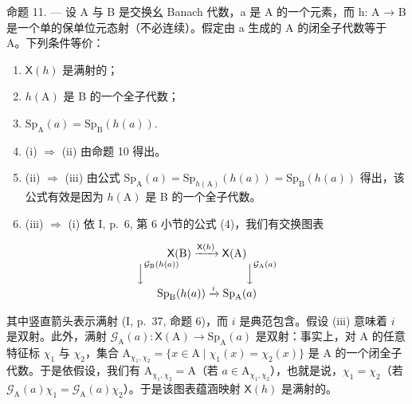 命题 11. --- 设 A 与 B 是交换幺 Banach 代数，a 是 A 的一个元素，而 h: A → B 是一个单的保单位元态射（不必连续）。假定由 a 生成的 A 的闭全子代数等于 A。下列条件等价：

\begin{enumerate}
\def\labelenumi{(\roman{enumi})}
\item
  \(\mathsf{X}(h)\) 是满射的；
\item
  \(h(\mathrm{A})\) 是 B 的一个全子代数；
\item
  \(\mathrm{Sp}_{\mathrm{A}}(a)=\mathrm{Sp}_{\mathrm{B}}(h(a)).\)
\item
  (i) \(\Longrightarrow\) (ii) 由命题 10 得出。
\item
  (ii) \(\Longrightarrow\) (iii) 由公式 \(\mathrm{Sp}_{\mathrm{A}}(a) = \mathrm{Sp}_{h(\mathrm{A})}(h(a)) = \mathrm{Sp}_{\mathrm{B}}(h(a))\) 得出，该公式有效是因为 \(h(\mathrm{A})\) 是 B 的一个全子代数。
\item
  (iii) \(\Longrightarrow\) (i) 依 I, p.~6, 第 6 小节的公式 (4)，我们有交换图表
\end{enumerate}

\[
\begin{array}{c} \mathsf {X} (\mathrm{B}) \xrightarrow {\mathsf {X} (h)} \mathsf {X} (\mathrm{A}) \\ \Big \downarrow^ {\mathcal {G} _ {\mathrm{B}} (h (a))} \qquad \qquad \qquad \Big \downarrow^ {\mathcal {G} _ {\mathrm{A}} (a)} \\ \operatorname{Sp} _ {\mathrm{B}} (h (a)) \xrightarrow {i} \operatorname{Sp} _ {\mathrm{A}} (a) \end{array}
\]

其中竖直箭头表示满射 (I, p.~37, 命题 6)，而 \(i\) 是典范包含。假设 (iii) 意味着 \(i\) 是双射。此外，满射 \(\mathcal{G}_{\mathrm{A}}(a)\colon \mathsf{X}(\mathrm{A})\to \mathrm{Sp}_{\mathrm{A}}(a)\) 是双射：事实上，对 A 的任意特征标 \(\chi_{1}\) 与 \(\chi_{2}\)，集合 \(\mathrm{A}_{\chi_1,\chi_2} = \{x\in \mathrm{A}\mid \chi_1(x) = \chi_2(x)\}\) 是 A 的一个闭全子代数。于是依假设，我们有 \(\mathrm{A}_{\chi_1,\chi_2} = \mathrm{A}\)（若 \(a\in \mathrm{A}_{\chi_1,\chi_2}\)），也就是说，\(\chi_{1} = \chi_{2}\)（若 \(\mathcal{G}_{\mathrm{A}}(a)\chi_{1} = \mathcal{G}_{\mathrm{A}}(a)\chi_{2}\)）。于是该图表蕴涵映射 \(\mathsf{X}(h)\) 是满射的。

